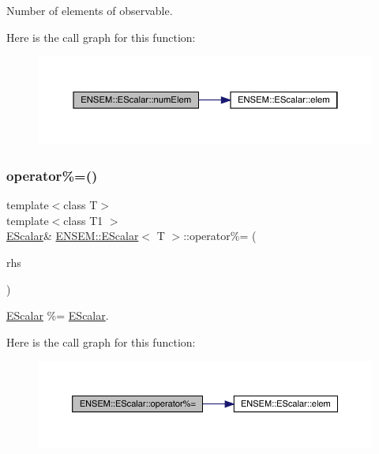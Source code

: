Number of elements of observable. 

Here is the call graph for this function\+:
\nopagebreak
\begin{figure}[H]
\begin{center}
\leavevmode
\includegraphics[width=350pt]{d0/d82/classENSEM_1_1EScalar_a63584568dc8b1817a57656cc072205b2_cgraph}
\end{center}
\end{figure}
\mbox{\label{classENSEM_1_1EScalar_ab4bd572c2f331fadf6914f406bce991f}} 
\subsubsection{\texorpdfstring{operator\%=()}{operator\%=()}\hspace{0.1cm}{\footnotesize\ttfamily [1/2]}}
{\footnotesize\ttfamily template$<$class T$>$ \\
template$<$class T1 $>$ \\
\mbox{\hyperlink{classENSEM_1_1EScalar}{E\+Scalar}}\& \mbox{\hyperlink{classENSEM_1_1EScalar}{E\+N\+S\+E\+M\+::\+E\+Scalar}}$<$ T $>$\+::operator\%= (\begin{DoxyParamCaption}\item[{const \mbox{\hyperlink{classENSEM_1_1EScalar}{E\+Scalar}}$<$ T1 $>$ \&}]{rhs }\end{DoxyParamCaption})\hspace{0.3cm}{\ttfamily [inline]}}



\mbox{\hyperlink{classENSEM_1_1EScalar}{E\+Scalar}} \%= \mbox{\hyperlink{classENSEM_1_1EScalar}{E\+Scalar}}. 

Here is the call graph for this function\+:
\nopagebreak
\begin{figure}[H]
\begin{center}
\leavevmode
\includegraphics[width=350pt]{d0/d82/classENSEM_1_1EScalar_ab4bd572c2f331fadf6914f406bce991f_cgraph}
\end{center}
\end{figure}
\mbox{\label{classENSEM_1_1EScalar_ab4bd572c2f331fadf6914f406bce991f}} 
